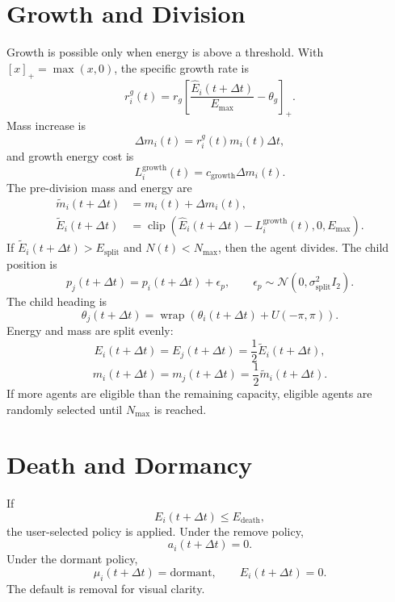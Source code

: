 \documentclass[11pt]{article}
\begin{document}
\section{Growth and Division}
Growth is possible only when energy is above a threshold. With
$[x]_+=\max(x,0)$, the specific growth rate is
\begin{equation}
  r_i^g(t)=r_g
  \left[\frac{\hat E_i(t+\Delta t)}{E_{\max}}-\theta_g\right]_+.
\end{equation}
Mass increase is
\begin{equation}
  \Delta m_i(t)=r_i^g(t)m_i(t)\Delta t,
\end{equation}
and growth energy cost is
\begin{equation}
  L_i^{\mathrm{growth}}(t)=c_{\mathrm{growth}}\Delta m_i(t).
\end{equation}
The pre-division mass and energy are
\begin{align}
  \tilde m_i(t+\Delta t)&=m_i(t)+\Delta m_i(t),\\
  \tilde E_i(t+\Delta t)&=
  \operatorname{clip}\left(\hat E_i(t+\Delta t)-L_i^{\mathrm{growth}}(t),0,E_{\max}\right).
\end{align}
If $\tilde E_i(t+\Delta t)>E_{\mathrm{split}}$ and $N(t)<N_{\max}$, then the
agent divides. The child position is
\begin{equation}
  p_j(t+\Delta t)=p_i(t+\Delta t)+\epsilon_p,\qquad
  \epsilon_p\sim\mathcal{N}(0,\sigma_{\mathrm{split}}^2I_2).
\end{equation}
The child heading is
\begin{equation}
  \theta_j(t+\Delta t)=
  \operatorname{wrap}\left(\theta_i(t+\Delta t)+U(-\pi,\pi)\right).
\end{equation}
Energy and mass are split evenly:
\begin{equation}
  E_i(t+\Delta t)=E_j(t+\Delta t)=\frac{1}{2}\tilde E_i(t+\Delta t),
\end{equation}
\begin{equation}
  m_i(t+\Delta t)=m_j(t+\Delta t)=\frac{1}{2}\tilde m_i(t+\Delta t).
\end{equation}
If more agents are eligible than the remaining capacity, eligible agents are
randomly selected until $N_{\max}$ is reached.

\section{Death and Dormancy}
If
\begin{equation}
  E_i(t+\Delta t)\le E_{\mathrm{death}},
\end{equation}
the user-selected policy is applied. Under the remove policy,
\begin{equation}
  a_i(t+\Delta t)=0.
\end{equation}
Under the dormant policy,
\begin{equation}
  \mu_i(t+\Delta t)=\mathrm{dormant},\qquad E_i(t+\Delta t)=0.
\end{equation}
The default is removal for visual clarity.
\end{document}
